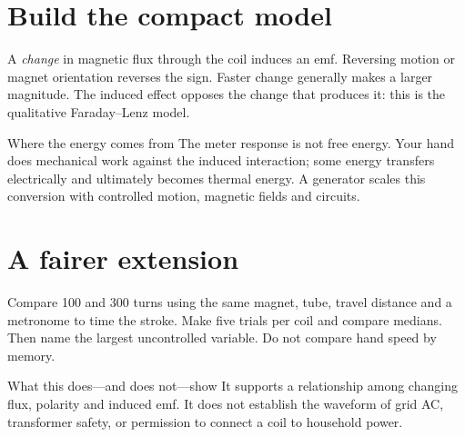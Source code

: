 \begin{labrecord}\end{labrecord}

\section{Build the compact model}
A \emph{change} in magnetic flux through the coil induces an emf. Reversing
motion or magnet orientation reverses the sign. Faster change generally makes
a larger magnitude. The induced effect opposes the change that produces it:
this is the qualitative Faraday--Lenz model.

\begin{telospanel}{Where the energy comes from}
The meter response is not free energy. Your hand does mechanical work against
the induced interaction; some energy transfers electrically and ultimately
becomes thermal energy. A generator scales this conversion with controlled
motion, magnetic fields and circuits.
\end{telospanel}

\section{A fairer extension}
Compare 100 and 300 turns using the same magnet, tube, travel distance and a
metronome to time the stroke. Make five trials per coil and compare medians.
Then name the largest uncontrolled variable. Do not compare hand speed by
memory.

\begin{teloscard}{What this does—and does not—show}
It supports a relationship among changing flux, polarity and induced emf. It
does not establish the waveform of grid AC, transformer safety, or permission
to connect a coil to household power.
\end{teloscard}


